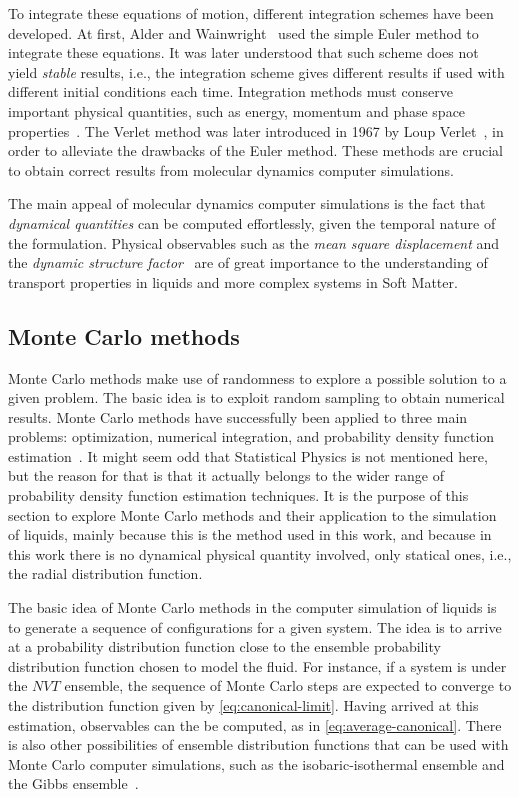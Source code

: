 To integrate these equations of motion, different integration schemes have been developed.
At first, Alder and Wainwright~\cite{alderPhaseTransitionHard1957a} used the simple
Euler method to integrate these equations. It was later understood that such scheme
does not yield \emph{stable} results, i.e., the integration scheme gives different results
if used with different initial conditions each time.
Integration methods must conserve important physical quantities, such as energy,
momentum and phase space properties~\cite{razafindralandyReviewGeometricIntegrators2018}.
The Verlet method was later introduced in 1967 by Loup Verlet~\cite{verletComputerExperimentsClassical1967a},
in order to alleviate the drawbacks of the Euler method. These methods are crucial to obtain
correct results from molecular dynamics computer simulations.

The main appeal of molecular dynamics computer simulations is the fact that
\emph{dynamical quantities} can be computed effortlessly, given the temporal nature 
of the formulation. Physical observables such
as the \emph{mean square displacement} and the \emph{dynamic structure factor}~\cite{dhontIntroductionDynamicsColloids1996,hansenTheorySimpleLiquids2013}
are of great importance to the understanding of transport properties in liquids and
more complex systems in Soft Matter.

\subsection{Monte Carlo methods}
Monte Carlo methods make use of randomness to explore a possible solution to a
given problem. The basic idea is to exploit random sampling to obtain numerical
results. Monte Carlo methods have successfully been applied to
three main problems: optimization, numerical integration, and probability density
function estimation~\cite{kroeseWhyMonteCarlo2014}. It might seem odd that Statistical
Physics is not mentioned here, but the reason for that is that it actually belongs to
the wider range of probability density function estimation techniques. It is the
purpose of this section to explore Monte Carlo methods and their application to
the simulation of liquids, mainly because this is the method used in this
work, and because in this work there is no dynamical physical quantity involved,
only statical ones, i.e., the radial distribution function.

The basic idea of Monte Carlo methods in the computer simulation of liquids is to
generate a sequence of configurations for a given system. The idea is to arrive at a
probability distribution function close to the ensemble probability distribution
function chosen to model the fluid. For instance, if a system
is under the $NVT$ ensemble, the sequence of Monte Carlo steps are expected to converge
to the distribution function given by \autoref{eq:canonical-limit}. Having arrived at this
estimation, observables can the be computed, as in \autoref{eq:average-canonical}.
There is also other possibilities of ensemble distribution functions that can be
used with Monte Carlo computer simulations, such as the isobaric-isothermal ensemble
and the Gibbs ensemble~\cite{frenkelUnderstandingMolecularSimulation2001}.

